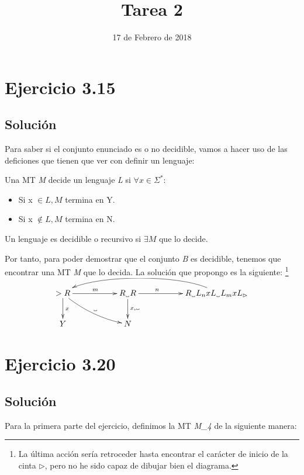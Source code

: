 \documentclass[11pt, a4paper, titlepage]{article}
\newcommand\vartextvisiblespace[1][.5em]{%
  \makebox[#1]{%
    \kern.07em
    \vrule height.3ex
    \hrulefill
    \vrule height.3ex
    \kern.07em
  }%
}
\begin{document}
\title{Tarea 2}
\date{17 de Febrero de 2018}
\maketitle
\newpage



\section*{Ejercicio 3.15}
\subsection*{Solución}


Para saber si el conjunto enunciado es o no decidible, vamos a hacer uso de las
deficiones que tienen que ver con definir un lenguaje:

Una MT \textit{M} decide un lenguaje \textit{L} si $\forall x \in \Sigma^*:$
\begin{itemize}
  \item Si x $\in \textit{L}, \textit{M}$ termina en Y.
  \item Si x $\notin \textit{L}, \textit{M}$ termina en N.
\end{itemize}

Un lenguaje es decidible o recursivo si $\exists \textit{M}$ que lo decide.


Por tanto, para poder demostrar que el conjunto \textit{B} es decidible, tenemos
que encontrar una MT \textit{M} que lo decida. La solución que propongo es la
siguiente: \footnote{La última acción sería retroceder hasta encontrar el
carácter de inicio de la cinta $\rhd$, pero no he sido capaz de dibujar bien el
diagrama.}

\[
\xymatrix{
  >R \ar[rr]^{m} \ar[d]^{x} \ar@/_/[rrd]^{\vartextvisiblespace} & & R_{\vartextvisiblespace}R \ar[d]^{x,\vartextvisiblespace} \ar[rr]^(.33){n} && R_{\vartextvisiblespace}L_{n}xL_{\vartextvisiblespace}L_{m}xL_{\rhd} \ar@(ul,ur)[llll] \\
  Y &&N
}
\]

\section*{Ejercicio 3.20}
\subsection*{Solución}

Para la primera parte del ejercicio, definimos la MT \textit{M_4} de la siguiente
manera:
\end{document}
